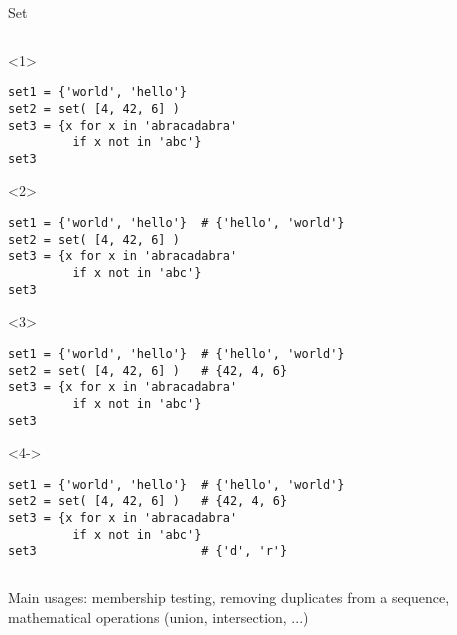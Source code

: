 \begin{frame}[fragile]{Set}

  \begin{columns}[onlytextwidth]
    \begin{column}{\textwidth}

      \begin{onlyenv}<1>
        \begin{lstlisting}[style=python,morekeywords={for, in, range, list}]
set1 = {'world', 'hello'}
set2 = set( [4, 42, 6] )
set3 = {x for x in 'abracadabra'
         if x not in 'abc'}
set3 \end{lstlisting}
      \end{onlyenv}

      \begin{onlyenv}<2>
        \begin{lstlisting}[style=python,morekeywords={for, in, range, list}]
set1 = {'world', 'hello'}  # {'hello', 'world'}
set2 = set( [4, 42, 6] )
set3 = {x for x in 'abracadabra'
         if x not in 'abc'}
set3 \end{lstlisting}
      \end{onlyenv}

      \begin{onlyenv}<3>
        \begin{lstlisting}[style=python,morekeywords={for, in, range, list}]
set1 = {'world', 'hello'}  # {'hello', 'world'}
set2 = set( [4, 42, 6] )   # {42, 4, 6}
set3 = {x for x in 'abracadabra'
         if x not in 'abc'}
set3 \end{lstlisting}
      \end{onlyenv}

      \begin{onlyenv}<4->
        \begin{lstlisting}[style=python,morekeywords={for, in, range, list}]
set1 = {'world', 'hello'}  # {'hello', 'world'}
set2 = set( [4, 42, 6] )   # {42, 4, 6}
set3 = {x for x in 'abracadabra'
         if x not in 'abc'}
set3                       # {'d', 'r'} \end{lstlisting}
      \end{onlyenv}

    \end{column}
  \end{columns}

  \bigskip

   Main usages: membership testing, removing duplicates from a sequence, mathematical operations (union, intersection, ...)


\end{frame}



